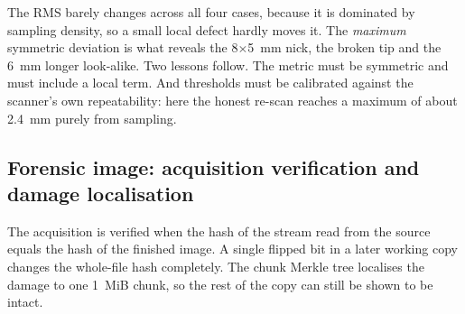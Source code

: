 The RMS barely changes across all four cases, because it is dominated by sampling density, so a small local defect hardly moves it. The \emph{maximum} symmetric deviation is what reveals the 8$\times$5~mm nick, the broken tip and the 6~mm longer look-alike. Two lessons follow. The metric must be symmetric and must include a local term. And thresholds must be calibrated against the scanner's own repeatability: here the honest re-scan reaches a maximum of about 2.4~mm purely from sampling.

\subsection{Forensic image: acquisition verification and damage localisation}
\begin{table}[htbp]
\centering\small

\caption{Acquisition of an 8 MiB medium; a single bit flipped later in a working copy.}
\label{tab:disk}
\end{table}

The acquisition is verified when the hash of the stream read from the source equals the hash of the finished image. A single flipped bit in a later working copy changes the whole-file hash completely. The chunk Merkle tree localises the damage to one 1~MiB chunk, so the rest of the copy can still be shown to be intact.
